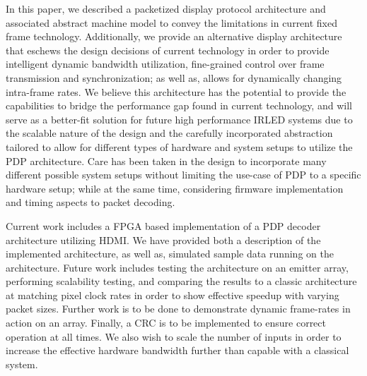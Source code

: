 \label{chap:conclusion}
In this paper, we described a packetized display protocol architecture and associated abstract machine model to convey the limitations in current fixed frame technology. Additionally, we provide an alternative display architecture that eschews the design decisions of current technology in order to provide intelligent dynamic bandwidth utilization, fine-grained control over frame transmission and synchronization; as well as, allows for dynamically changing intra-frame rates. We believe this architecture has the potential to provide the capabilities to bridge the performance gap found in current technology, and will serve as a better-fit solution for future high performance IRLED systems due to the scalable nature of the design and the carefully incorporated abstraction tailored to allow for different types of hardware and system setups to utilize the PDP architecture. Care has been taken in the design to incorporate many different possible system setups without limiting the use-case of PDP to a specific hardware setup; while at the same time, considering firmware implementation and timing aspects to packet decoding.

Current work includes a FPGA based implementation of a PDP decoder architecture utilizing HDMI. We have provided both a description of the implemented architecture, as well as, simulated sample data running on the architecture. Future work includes testing the architecture on an emitter array, performing scalability testing, and comparing the results to a classic architecture at matching pixel clock rates in order to show effective speedup with varying packet sizes. Further work is to be done to demonstrate dynamic frame-rates in action on an array. Finally, a CRC is to be implemented to ensure correct operation at all times. We also wish to scale the number of inputs in order to increase the effective hardware bandwidth further than capable with a classical system.
